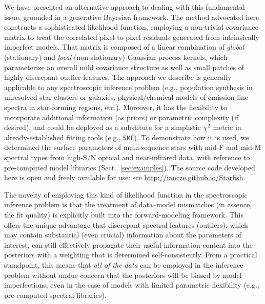 \documentclass[iop,floatfix,numberedappendix,twocolappendix]{emulateapj}
\begin{document}
We have presented an alternative approach to dealing with this fundamental issue, grounded in a 
generative Bayesian framework.  The method advocated here constructs a sophisticated 
likelihood function, employing a non-trivial covariance matrix to treat the correlated 
pixel-to-pixel residuals generated from intrinsically imperfect models.  That matrix is composed of 
a linear combination of {\it global} (stationary) and {\it local} (non-stationary) Gaussian 
process kernels, which parameterize an overall mild covariance structure as well as small patches 
of highly discrepant outlier features.  The approach we describe is generally applicable to any 
spectroscopic inference problem (e.g., population synthesis in unresolved star clusters or 
galaxies, physical/chemical models of emission line spectra in star-forming regions, etc.).  
Moreover, it has the flexibility to incorporate additional information (as priors) or parametric 
complexity (if desired), and could be deployed as a substitute for a simplistic $\chi^2$ metric in 
already-established fitting tools (e.g., {\tt SME}).  To demonstrate how it is used, we determined 
the surface parameters of main-sequence stars with mid-F and mid-M spectral types from high-S/N 
optical and near-infrared data, with reference to pre-computed model libraries 
(Sect.~\ref{sec:examples}).  The source code developed here is open and freely available for use: 
see \url{http://iancze.github.io/Starfish}.


The novelty of employing this kind of likelihood function in the spectroscopic inference problem is 
that the treatment of data--model mismatches (in essence, the fit quality) is explicitly built into 
the forward-modeling framework.  This offers the unique advantage that discrepant spectral features 
(outliers), which may contain substantial (even crucial) information about the parameters of 
interest, can still effectively propagate their useful information content into the posteriors with 
a weighting that is determined self-consistently.  From a practical standpoint, this means that 
{\it all of the data} can be employed in the inference problem without undue concern that the 
posteriors will be biased by model imperfections, even in the case of models with limited 
parametric flexibility (e.g., pre-computed spectral libraries).
\end{document}
